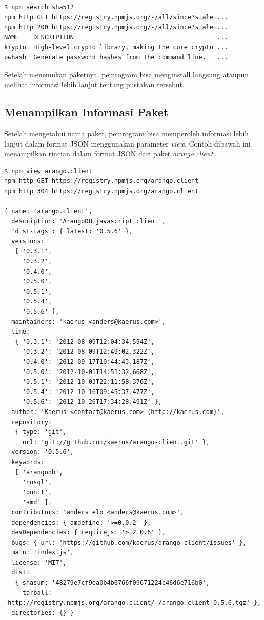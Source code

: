 \lstset{language=bash,caption=Perintah menghapus paket di npm}
\begin{lstlisting}
$ npm search sha512
npm http GET https://registry.npmjs.org/-/all/since?stale=...
npm http 200 https://registry.npmjs.org/-/all/since?stale=...
NAME    DESCRIPTION                                       ...
krypto  High-level crypto library, making the core crypto ...
pwhash  Generate password hashes from the command line.   ...
\end{lstlisting}

Setelah menemukan paketnya, pemrogram bisa menginstall langsung ataupun melihat informasi lebih lanjut tentang pustakan tersebut.

\subsection{Menampilkan Informasi Paket}

Setelah mengetahui nama paket, pemrogram bisa memperoleh informasi lebih lanjut dalam format JSON menggunakan parameter \textit{view}. Contoh dibawah ini menampilkan rincian dalam format JSON dari paket \textit{arango.client}:

\lstset{language=bash,caption=Menampilkan rincian suatu paket dalam format JSON}
\begin{lstlisting}
$ npm view arango.client
npm http GET https://registry.npmjs.org/arango.client
npm http 304 https://registry.npmjs.org/arango.client

{ name: 'arango.client',
  description: 'ArangoDB javascript client',
  'dist-tags': { latest: '0.5.6' },
  versions: 
   [ '0.3.1',
     '0.3.2',
     '0.4.0',
     '0.5.0',
     '0.5.1',
     '0.5.4',
     '0.5.6' ],
  maintainers: 'kaerus <anders@kaerus.com>',
  time: 
   { '0.3.1': '2012-08-09T12:04:34.594Z',
     '0.3.2': '2012-08-09T12:49:02.322Z',
     '0.4.0': '2012-09-17T10:44:43.187Z',
     '0.5.0': '2012-10-01T14:51:32.668Z',
     '0.5.1': '2012-10-03T22:11:58.376Z',
     '0.5.4': '2012-10-16T09:45:37.477Z',
     '0.5.6': '2012-10-26T17:34:28.491Z' },
  author: 'Kaerus <contact@kaerus.com> (http://kaerus.com)',
  repository: 
   { type: 'git',
     url: 'git://github.com/kaerus/arango-client.git' },
  version: '0.5.6',
  keywords: 
   [ 'arangodb',
     'nosql',
     'qunit',
     'amd' ],
  contributors: 'anders elo <anders@kaerus.com>',
  dependencies: { amdefine: '>=0.0.2' },
  devDependencies: { requirejs: '>=2.0.6' },
  bugs: { url: 'https://github.com/kaerus/arango-client/issues' },
  main: 'index.js',
  license: 'MIT',
  dist: 
   { shasum: '48279e7cf9ea0b4b6766f09671224c46d6e716b0',
     tarball: 'http://registry.npmjs.org/arango.client/-/arango.client-0.5.6.tgz' },
  directories: {} }
\end{lstlisting}

